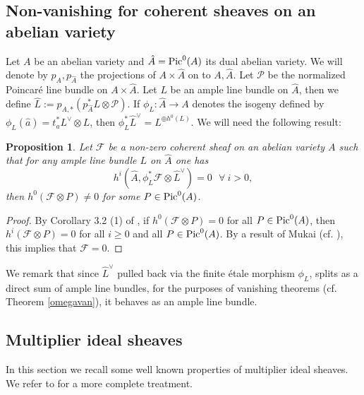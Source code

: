 \documentclass[10pt, a4paper]{amsart}
\newtheorem{prop}[thm]{Proposition}
\newcommand\Pic{{\text{\rm Pic}}}
\newcommand\lra{\longrightarrow}
\newcommand\ot{{\otimes}}
\newcommand\PP{{\mathcal{P}}}
\newcommand\FF{{\mathcal{F}}}
\begin{document}
\subsection{Non-vanishing for coherent sheaves on an abelian variety}
Let $A$ be an abelian variety and $\hat{A}=\Pic ^0(A)$ its 
dual abelian variety. We will denote by $p_A,p_{\hat {A}}$ the projections
of $A\times \hat{A}$ on to $A,\hat {A}$. Let $\PP $ be the normalized 
Poincar\'e line bundle on $A\times \hat {A}$.
Let $L$ be an ample line bundle on $\hat {A}$, then we define
$\hat{L}:=p_{A,*}(p_{\hat{A}}^*L\ot \PP )$. If $\phi _L :\hat{A}\lra A$
denotes the isogeny defined by $\phi _L(\hat{a})=t_{\hat{a}}^*L^\vee\ot L$,
then $\phi _L^*\hat{L}^\vee=L^{\oplus {h^0(L)}}$.
We will need the following result:
\begin{prop}\label{gvt} 
Let $\FF$ be a non-zero
coherent sheaf on an abelian variety $A$ such that for any ample
line bundle $L$ on $\hat {A}$ one has 
$$h^i(\hat {A},\phi _L^*\FF \ot \hat{L}^\vee)=0\ \ \ \forall \ i>0,$$
then $h^0(\FF \ot P)\ne 0$ for some $P\in \Pic ^0(A)$.
\end{prop}
\begin{proof} By Corollary 3.2 (1) of \cite{Hac}, if $h^0(\FF \ot P)=0$ for all
$P\in \Pic ^0(A)$, then $h^i(\FF \ot P)=0$ for all $i\geq 0$ and all
$P\in \Pic ^0(A)$. By a result of Mukai (cf. \cite{Mu}), this implies that
$\FF=0$. 
\end{proof}
We remark that since $\hat{L}^\vee$ pulled back via the finite \'etale
morphism $\phi _L$, splits as a direct sum of ample line bundles,
for the purposes of vanishing theorems (cf. Theorem \ref{omegavan}), 
it behaves as an ample line bundle.

\subsection{Multiplier ideal sheaves}\label{MIS}
In this section we recall some well known properties of multiplier
ideal sheaves. We refer to \cite{La} for a more complete treatment.
\end{document}
